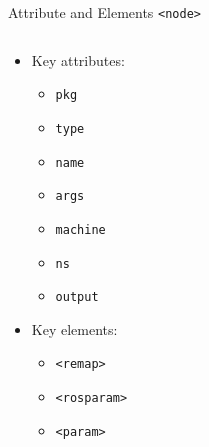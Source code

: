 \documentclass[aspectratio=43]{beamer}
\newcommand{\inline}[1]{\texttt{#1}}
\begin{document}
\begin{frame}{Attribute and Elements \texttt{<node>}}
	\begin{columns}
		\begin{column}{0.6\textwidth}
			\begin{itemize}
				\item Key attributes:
					\begin{itemize}
						\item \inline{pkg} 
						\item \inline{type} 
						\item \inline{name} 
						\item \inline{args} 
						\item \inline{machine} 
						\item \inline{ns} 
						\item \inline{output} 
					\end{itemize}
				\item Key elements:
					\begin{itemize}
						\item \inline{<remap>}
						\item \inline{<rosparam>}
						\item \inline{<param>}
					\end{itemize}
			\end{itemize}
		\end{column}
		\begin{column}{0.4\textwidth}
			\centering
		\end{column}
	\end{columns}
\end{frame}

\end{document}
